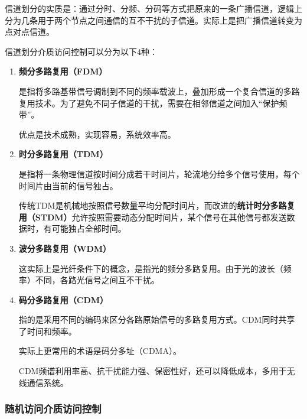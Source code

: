 \documentclass[12pt, a4paper, oneside]{ctexart}
\begin{document}
信道划分的实质是：通过分时、分频、分码等方式把原来的一条广播信道，逻辑上分为几条用于两个节点之间通信的互不干扰的子信道。实际上是把广播信道转变为点对点信道。

信道划分介质访问控制可以分为以下4种：
\begin{enumerate}
    \item {\bf 频分多路复用（FDM）}
    
    是指将多路基带信号调制到不同的频率载波上，叠加形成一个复合信道的多路复用技术。为了避免不同子信道的干扰，需要在相邻信道之间加入“保护频带”。

    优点是技术成熟，实现容易，系统效率高。
    \item {\bf 时分多路复用（TDM）}
    
    是指将一条物理信道按时间分成若干时间片，轮流地分给多个信号使用，每个时间片由当前的信号独占。

    传统TDM是机械地按照信号数量平均分配时间片，而改进的\textbf{统计时分多路复用（STDM）}允许按照需要动态分配时间片，某个信号在其他信号都发送数据时，有可能独占全部时间。
    \item {\bf 波分多路复用（WDM）}
    
    这实际上是光纤条件下的概念，是指光的频分多路复用。由于光的波长（频率）不同，各路光信号之间互不干扰。
    \item {\bf 码分多路复用（CDM）}
    
    指的是采用不同的编码来区分各路原始信号的多路复用方式。CDM同时共享了时间和频率。

    实际上更常用的术语是码分多址（CDMA）。

    CDM频谱利用率高、抗干扰能力强、保密性好，还可以降低成本，多用于无线通信系统。
\end{enumerate}

\subsubsection{随机访问介质访问控制}
\end{document}
